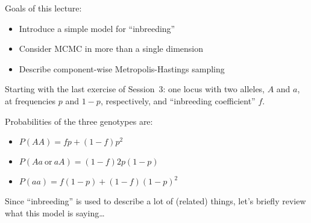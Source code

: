 








Goals of this lecture:
\begin{itemize}
\item Introduce a simple model for ``inbreeding''
\item Consider MCMC in more than a single dimension
\item Describe component-wise Metropolis-Hastings sampling 
\end{itemize}

Starting with the last exercise of Session~3: one locus with two alleles, $A$ and $a$, at frequencies $p$ and $1-p$, respectively, and ``inbreeding coefficient'' $f$.

Probabilities of the three genotypes are:
\begin{itemize}
\item $P(AA) = fp + (1-f)p^2$
\item $P(Aa~\mathrm{or}~aA) = (1-f)2p(1-p)$
\item $P(aa) = f(1-p) + (1-f)(1-p)^2$
\end{itemize}

Since ``inbreeding'' is used to describe a lot of (related) things, let's briefly review what this model is saying\ldots




